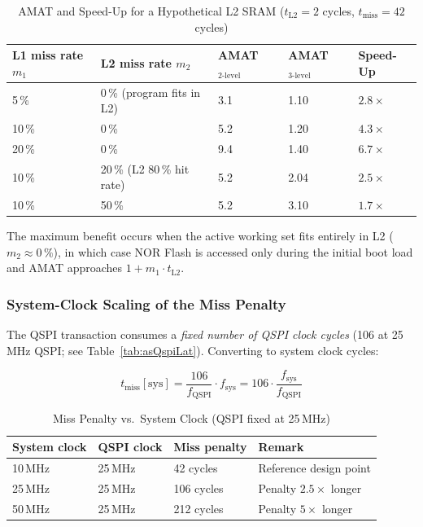 \begin{table}[H]
\caption{AMAT and Speed-Up for a Hypothetical L2 SRAM
         ($t_\text{L2} = 2$ cycles, $t_\text{miss} = 42$ cycles)}
\label{tab:asMemSpeedup}
\centering
\begin{tabularx}{\textwidth}{|l |l |l |l |l|}
  \hline
  L1 miss rate $m_1$ & L2 miss rate $m_2$ & AMAT$_\text{2-level}$ &
  AMAT$_\text{3-level}$ & Speed-Up \\
  \hline
  \hline
  5\,\%  & 0\,\% (program fits in L2)  & 3.1 & 1.10 & $2.8\times$ \\
  \hline
  10\,\% & 0\,\%                       & 5.2 & 1.20 & $4.3\times$ \\
  \hline
  20\,\% & 0\,\%                       & 9.4 & 1.40 & $6.7\times$ \\
  \hline
  10\,\% & 20\,\% (L2 80\,\% hit rate) & 5.2 & 2.04 & $2.5\times$ \\
  \hline
  10\,\% & 50\,\%                       & 5.2 & 3.10 & $1.7\times$ \\
  \hline
\end{tabularx}
\end{table}

The maximum benefit occurs when the active working set fits entirely
in L2 ($m_2 \approx 0\,\%$), in which case NOR Flash is accessed only
during the initial boot load and AMAT approaches $1 + m_1 \cdot t_\text{L2}$.

\subsubsection{System-Clock Scaling of the Miss Penalty}

The QSPI transaction consumes a \emph{fixed number of QSPI clock cycles}
(106 at 25\,MHz QSPI; see Table~\ref{tab:asQspiLat}).
Converting to system clock cycles:

\[
  t_\text{miss}[\text{sys}] = \frac{106}{f_\text{QSPI}} \cdot f_\text{sys}
  = 106 \cdot \frac{f_\text{sys}}{f_\text{QSPI}}
\]

\begin{table}[H]
\caption{Miss Penalty vs.\ System Clock (QSPI fixed at 25\,MHz)}
\label{tab:asQspiMissPenaltyScaling}
\centering
\begin{tabularx}{\textwidth}{|l |l |l |X|}
  \hline
  System clock & QSPI clock & Miss penalty & Remark \\
  \hline
  \hline
  10\,MHz & 25\,MHz & 42 cycles  & Reference design point \\
  \hline
  25\,MHz & 25\,MHz & 106 cycles & Penalty $2.5\times$ longer \\
  \hline
  50\,MHz & 25\,MHz & 212 cycles & Penalty $5\times$ longer \\
  \hline
\end{tabularx}
\end{table}

